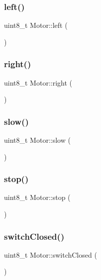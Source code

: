 \subsubsection{\texorpdfstring{left()}{left()}}
{\footnotesize\ttfamily uint8\+\_\+t Motor\+::left (\begin{DoxyParamCaption}{ }\end{DoxyParamCaption})}

\hypertarget{class_motor_a517e585f6a9a335347f9a1230d2fc0e1}{}\label{class_motor_a517e585f6a9a335347f9a1230d2fc0e1} 
\subsubsection{\texorpdfstring{right()}{right()}}
{\footnotesize\ttfamily uint8\+\_\+t Motor\+::right (\begin{DoxyParamCaption}{ }\end{DoxyParamCaption})}

\hypertarget{class_motor_a960a19729dc479265b1e5fea243de4c0}{}\label{class_motor_a960a19729dc479265b1e5fea243de4c0} 
\subsubsection{\texorpdfstring{slow()}{slow()}}
{\footnotesize\ttfamily uint8\+\_\+t Motor\+::slow (\begin{DoxyParamCaption}{ }\end{DoxyParamCaption})}

\hypertarget{class_motor_aab732159d4adf537bbcd3bcf9371d03b}{}\label{class_motor_aab732159d4adf537bbcd3bcf9371d03b} 
\subsubsection{\texorpdfstring{stop()}{stop()}}
{\footnotesize\ttfamily uint8\+\_\+t Motor\+::stop (\begin{DoxyParamCaption}{ }\end{DoxyParamCaption})}

\hypertarget{class_motor_a38af68cbad8be09b85afc86f156f0f89}{}\label{class_motor_a38af68cbad8be09b85afc86f156f0f89} 
\subsubsection{\texorpdfstring{switch\+Closed()}{switchClosed()}}
{\footnotesize\ttfamily uint8\+\_\+t Motor\+::switch\+Closed (\begin{DoxyParamCaption}{ }\end{DoxyParamCaption})}

